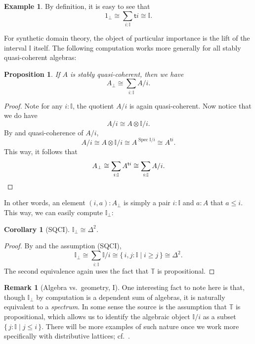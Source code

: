 \documentclass[12pt]{amsart}
\newtheorem{corollary}[theorem]{Corollary}
\newtheorem{proposition}[theorem]{Proposition}
\theoremstyle{definition}
\newtheorem{example}[theorem]{Example}
\newtheorem{remark}[theorem]{Remark}
\newcommand{\mbb}[1]{\mathbb{#1}}
\newcommand{\T}{\mbb T}
\newcommand{\I}{\mbb I}
\newcommand{\ms}[1]{\mathsf{#1}}
\newcommand{\scomp}[2]{\{\,#1\mid#2\,\}}
\newcommand{\prt}{_{\bot}}
\newcommand{\spec}{\operatorname{Spec}}
\begin{document}
\begin{example}
  By definition, it is easy to see that
  \[ 1\prt \cong \sum_{i:\I}\ms ti \cong \I. \]
\end{example}

For synthetic domain theory, the object of particular importance is the lift of the interval $\I$ itself. The following computation works more generally for all stably quasi-coherent algebras:

\begin{proposition}\label{prop:liftingofalgebra}
  If $A$ is stably quasi-coherent, then we have
  \[ A\prt \cong \sum_{i:\I}A/i. \]
\end{proposition}
\begin{proof}
  Note for any $i : \I$, the quotient $A/i$ is again quasi-coherent. Now notice that we do have
  \[ A/i \cong A \otimes \I/i. \]
  By  and quasi-coherence of $A/i$, 
  \[ A/i \cong A \otimes \I/i \cong A^{\spec \I/i} \cong A^{\ms ti}. \]
  This way, it follows that 
  \[ A\prt \cong \sum_{i:\I}A^{\ms ti} \cong \sum_{i:\I}A/i. \qedhere \]
\end{proof}

In other words, an element $(i,a) : A\prt$ is simply a pair $i : \I$ and $a : A$ that $a \le i$. This way, we can easily compute $\I\prt$:

\begin{corollary}[SQCI]
  $\I\prt \cong \Delta^2$.
\end{corollary}
\begin{proof}
  By  and the assumption (SQCI),
  \[ \I\prt \cong \sum_{i:\I}\I/i \cong \scomp{i,j : \I}{i \ge j} \cong \Delta^2. \]
  The second equivalence again uses the fact that $\T$ is propositional.
\end{proof}

\begin{remark}[Algebra vs.\ geometry, I]

  One interesting fact to note here is that, though $\I\prt$ by computation is a dependent sum of algebras, it is naturally equivalent to a \emph{spectrum}. In some sense the source is the assumption that $\T$ is propositional, which allows us to identify the algebraic object $\I/i$ as a subset $\scomp{j : \I}{j \le i}$. There will be more examples of such nature once we work more specifically with distributive lattices; cf.\ .
\end{remark}
\end{document}
